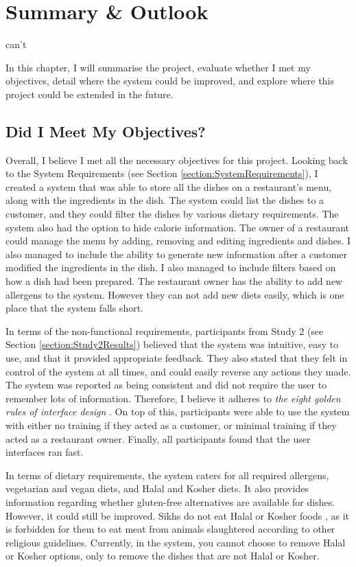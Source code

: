 \chapter{Summary \& Outlook}can't
\label{section:Evaluation}

In this chapter, I will summarise the project, evaluate whether I met my objectives, detail where the system could be improved, and explore where this project could be extended in the future.

\section{Did I Meet My Objectives?}

Overall, I believe I met all the necessary objectives for this project. Looking back to the System Requirements (see Section \ref{section:SystemRequirements}), I created a system that was able to store all the dishes on a restaurant's menu, along with the ingredients in the dish. The system could list the dishes to a customer, and they could filter the dishes by various dietary requirements. The system also had the option to hide calorie information. The owner of a restaurant could manage the menu by adding, removing and editing ingredients and dishes. I also managed to include the ability to generate new information after a customer modified the ingredients in the dish. I also managed to include filters based on how a dish had been prepared. The restaurant owner has the ability to add new allergens to the system. However they can not add new diets easily, which is one place that the system falls short.

In terms of the non-functional requirements, participants from Study 2 (see Section \ref{section:Study2Results}) believed that the system was intuitive, easy to use, and that it provided appropriate feedback. They also stated that they felt in control of the system at all times, and could easily reverse any actions they made. The system was reported as being consistent and did not require the user to remember lots of information. Therefore, I believe it adheres to \textit{the eight golden rules of interface design} \cite{shneiderman}. On top of this, participants were able to use the system with either no training if they acted as a customer, or minimal training if they acted as a restaurant owner. Finally, all participants found that the user interfaces ran fast.

In terms of dietary requirements, the system caters for all required allergens, vegetarian and vegan diets, and Halal and Kosher diets. It also provides information regarding whether gluten-free alternatives are available for dishes. However, it could still be improved. Sikhs do not eat Halal or Kosher foods \cite{guidance_on_foods_for_religious_faiths_2009}, as it is forbidden for them to eat meat from animals slaughtered according to other religious guidelines. Currently, in the system, you cannot choose to remove Halal or Kosher options, only to remove the dishes that are not Halal or Kosher.

